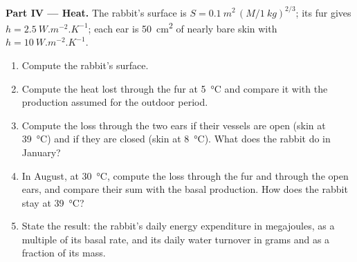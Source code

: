 \begin{problem}
\medskip
\noindent\textbf{Part IV --- Heat.}
The rabbit's surface is $S = \qty{0.1}{m^2}\,(M/\qty{1}{kg})^{2/3}$;
its fur gives $h = \qty{2.5}{W.m^{-2}.K^{-1}}$; each ear is
\qty{50}{cm^2} of nearly bare skin with $h = \qty{10}{W.m^{-2}.K^{-1}}$.
\begin{enumerate}[resume]
  \item Compute the rabbit's surface.
  \item Compute the heat lost through the fur at \qty{5}{\celsius} and
        compare it with the production assumed for the outdoor period.
  \item Compute the loss through the two ears if their vessels are open
        (skin at \qty{39}{\celsius}) and if they are closed (skin at
        \qty{8}{\celsius}). What does the rabbit do in January?
  \item In August, at \qty{30}{\celsius}, compute the loss through the
        fur and through the open ears, and compare their sum with the
        basal production. How does the rabbit stay at
        \qty{39}{\celsius}?
  \item State the result: the rabbit's daily energy expenditure in
        megajoules, as a multiple of its basal rate, and its daily
        water turnover in grams and as a fraction of its mass.
\end{enumerate}
\end{problem}
